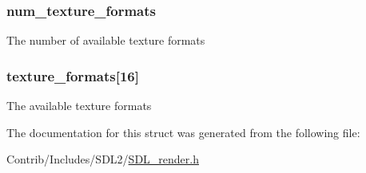 \subsubsection[{\texorpdfstring{num\+\_\+texture\+\_\+formats}{num_texture_formats}}]{ num\+\_\+texture\+\_\+formats}\hypertarget{struct_s_d_l___renderer_info_a0cfcc641f2a99b9f5a0e3e3eb5fbbefe}{}\label{struct_s_d_l___renderer_info_a0cfcc641f2a99b9f5a0e3e3eb5fbbefe}
The number of available texture formats 
\subsubsection[{\texorpdfstring{texture\+\_\+formats}{texture_formats}}]{ texture\+\_\+formats\mbox{[}16\mbox{]}}\hypertarget{struct_s_d_l___renderer_info_ac164ceadcdd8ed21d07370501fffed2c}{}\label{struct_s_d_l___renderer_info_ac164ceadcdd8ed21d07370501fffed2c}
The available texture formats 

The documentation for this struct was generated from the following file\+:\begin{DoxyCompactItemize}
\item 
Contrib/\+Includes/\+S\+D\+L2/\hyperlink{_s_d_l__render_8h}{S\+D\+L\+\_\+render.\+h}\end{DoxyCompactItemize}
